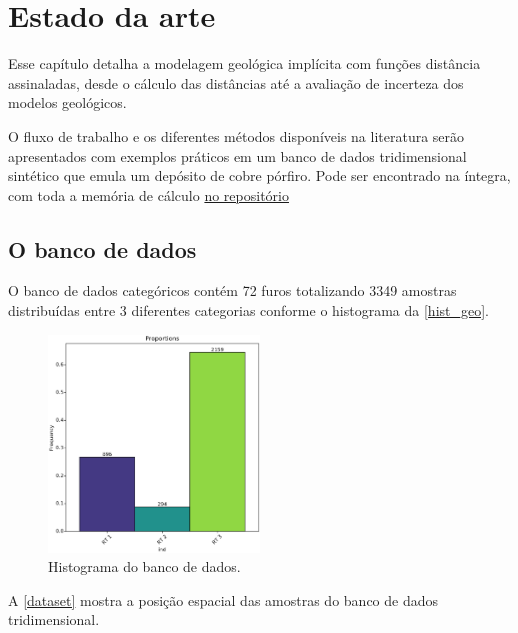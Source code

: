 \chapter{Estado da arte} \label{capitulo_2}

Esse capítulo detalha a modelagem geológica implícita com funções distância assinaladas, desde o cálculo das distâncias até a avaliação de incerteza dos modelos geológicos.

O fluxo de trabalho e os diferentes métodos disponíveis na literatura serão apresentados com exemplos práticos em um banco de dados tridimensional sintético que emula um depósito de cobre pórfiro. Pode ser encontrado na íntegra, com toda a memória de cálculo \href{https://drive.google.com/open?id=1JLRrOtOzDVCEpqnG8Ik95xws7Dw6MBvJ}{no repositório}

\section{O banco de dados}

O banco de dados categóricos contém 72 furos totalizando 3349 amostras distribuídas entre 3 diferentes categorias conforme o histograma da \autoref{hist_geo}.

\begin{figure}[H]
	\caption{\label{hist_geo}Histograma do banco de dados.}
	\begin{center}
		\includegraphics[width=0.5\textwidth]{capitulo_2/prop_hist_big.png}
	\end{center}
\end{figure}

A \autoref{dataset} mostra a posição espacial das amostras do banco de dados tridimensional.

